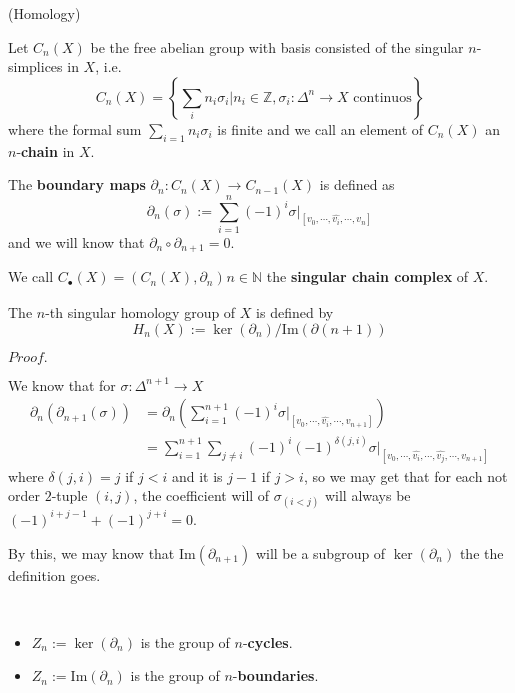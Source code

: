 \documentclass{article}
\newcommand{\Pf}[1]{$Proof.$\par}
\begin{document}
\begin{definition}(Homology)\par
    Let $C_n(X)$ be the free abelian group with basis consisted of the singular $n$-simplices in $X$, i.e.
    \[C_n(X) = \left\{\sum\limits_{i} n_i \sigma_i| n_i\in \mathbb{Z}, \sigma_i: \Delta^n \to X\text{ continuos}\right\}\]
    where the formal sum $\sum\limits_{i=1}n_i\sigma_i$ is finite and we call an element of $C_n(X)$ an $n$-\textbf{chain} in $X$.\par
    The \textbf{boundary maps} $\partial_n: C_n(X) \to C_{n-1}(X)$ is defined as
    \[
    \partial_n(\sigma) := \sum\limits_{i=1}^n (-1)^i \sigma|_{[v_0,\cdots,\hat{v_i},\cdots,v_n]}
    \]
    and we will know that $\partial_n\circ \partial_{n+1} = 0$.\par
    We call $C_{\bullet}(X) = (C_n(X),\partial_n)_{}n\in\mathbb{N}$ the \textbf{singular chain complex} of $X$.\par
    The $n$-th singular homology group of $X$ is defined by
    \[H_n(X):=\ker(\partial_n)/\text{Im}(\partial(n+1))\]
\end{definition}
\Pf\par
    We know that for $\sigma:\Delta^{n+1}\to X$
    \[
    \begin{aligned}
    \partial_n(\partial_{n+1}(\sigma)) &= \partial_n\left(\sum\limits_{i=1}^{n+1}(-1)^i \sigma|_{[v_0,\cdots,\hat{v_i},\cdots,v_{n+1}]}\right) \\
    &= \sum\limits_{i=1}^{n+1}\sum\limits_{j\neq i}(-1)^i (-1)^{\delta(j,i)}\sigma|_{[v_0,\cdots,\hat{v_i},\cdots,\hat{v_j},\cdots,v_{n+1}]} 
    \end{aligned}
    \]
    where $\delta(j,i) = j$ if $j<i$ and it is $j-1$ if $j>i$, so we may get that for each not order $2$-tuple $(i,j)$, the coefficient will of $\sigma_{(i<j)}$ will always be $(-1)^{i+j-1}+(-1)^{j+i} = 0$.\par
    By this, we may know that $\text{Im}(\partial_{n+1})$ will be a subgroup of $\ker(\partial_n)$ the the definition goes.

\begin{definition}\ \par
    \begin{itemize}
        \item $Z_n:=\ker(\partial_n)$ is the group of $n$-\textbf{cycles}.
        \item $Z_n:=\text{Im}(\partial_n)$ is the group of $n$-\textbf{boundaries}.
    \end{itemize}
\end{definition}
    
\end{document}
